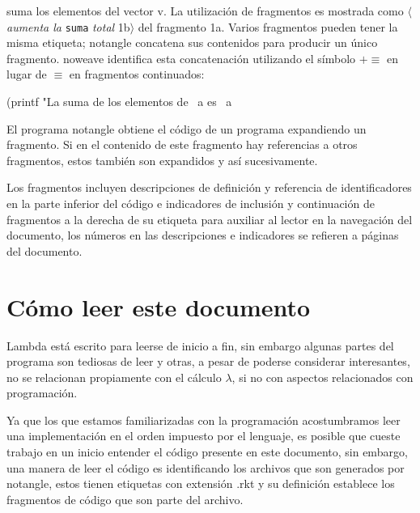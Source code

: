\documentclass[letterpaper, twoside, openright, 11pt]{book}%
\begin{document}
\noindent suma los elementos del vector {\Tt{}v\nwendquote}. La utilización de fragmentos es mostrada como $\langle$\emph{aumenta la} \texttt{suma} \emph{total} 1b$\rangle$ del fragmento 1a. Varios fragmentos pueden tener la misma etiqueta; {\Tt{}notangle\nwendquote} concatena sus contenidos para producir un único fragmento. {\Tt{}noweave\nwendquote} identifica esta concatenación utilizando el símbolo $ +\! \equiv $ en lugar de $ \equiv $ en fragmentos continuados:

\nwenddocs{}\plusendmoddef\nwstartdeflinemarkup{}\nwenddeflinemarkup
(printf "La suma de los elementos de ~a es ~a~%
\nwendcode{}\nwdocspar

\noindent El programa {\Tt{}notangle\nwendquote} obtiene el código de un programa expandiendo un fragmento. Si en el contenido de este fragmento hay referencias a otros fragmentos, estos también son expandidos y así sucesivamente.

Los fragmentos incluyen descripciones de definición y referencia de identificadores en la parte inferior del código e indicadores de inclusión y continuación de fragmentos a la derecha de su etiqueta para auxiliar al lector en la navegación del documento, los números en las descripciones e indicadores se refieren a páginas del documento.

\section{Cómo leer este documento}

{\Tt{}Lambda\nwendquote} está escrito para leerse de inicio a fin, sin embargo algunas partes del programa son tediosas de leer y otras, a pesar de poderse considerar interesantes, no se relacionan propiamente con el cálculo $ \lambda $, si no con aspectos relacionados con programación.

Ya que los que estamos familiarizadas con la programación acostumbramos leer una implementación en el orden impuesto por el lenguaje, es posible que cueste trabajo en un inicio entender el código presente en este documento, sin embargo, una manera de leer el código es identificando los archivos que son generados por {\Tt{}notangle\nwendquote}, estos tienen etiquetas con extensión {\Tt{}.rkt\nwendquote} y su definición establece los fragmentos de código que son parte del archivo.
\end{document}
